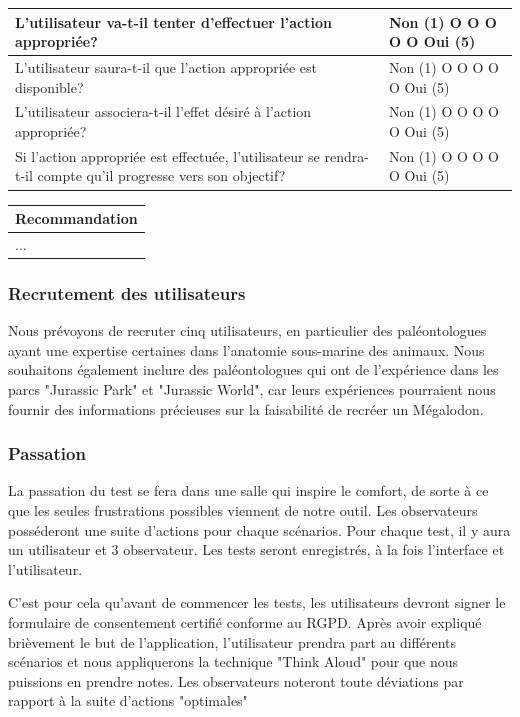 \documentclass{article}
\begin{document}
\begin{table}[h]
\centering
\begin{tabular}{|p{4cm}|p{6cm}|}
\hline
L’utilisateur va-t-il tenter d’effectuer l’action appropriée?  &  Non (1) O O O O O Oui (5)\\ \hline
L’utilisateur saura-t-il que l’action appropriée est disponible?  &  Non (1) O O O O O Oui (5)\\ \hline
L’utilisateur associera-t-il l’effet désiré à l’action appropriée?  &  Non (1) O O O O O Oui (5)\\ \hline
Si l’action appropriée est effectuée, l’utilisateur se rendra-t-il compte qu’il progresse vers son objectif?  &  Non (1) O O O O O Oui (5)\\ \hline
\end{tabular}
\end{table}

\begin{table}[h]
\centering
\begin{tabular}{|p{10cm}|}
\hline
Recommandation  \\ \hline
...  \\ \hline
\end{tabular}
\end{table}

\clearpage
\subsubsection{Recrutement des utilisateurs}
Nous prévoyons de recruter cinq utilisateurs, en particulier des paléontologues ayant une expertise certaines dans l'anatomie sous-marine des animaux. Nous souhaitons également inclure des paléontologues qui ont de l'expérience dans les parcs "Jurassic Park" et "Jurassic World", car leurs expériences pourraient nous fournir des informations précieuses sur la faisabilité de recréer un Mégalodon.



\subsubsection{Passation}
La passation du test se fera dans une salle qui inspire le comfort, de sorte à ce que les seules frustrations possibles viennent de notre outil. Les observateurs posséderont une suite d'actions pour chaque scénarios. Pour chaque test, il y aura un utilisateur et 3 observateur. Les tests seront enregistrés, à la fois l'interface et l'utilisateur.

C'est pour cela qu'avant de commencer les tests, les utilisateurs devront signer le formulaire de consentement certifié conforme au RGPD. Après avoir expliqué brièvement le but de l'application, l'utilisateur prendra part au différents scénarios et nous appliquerons la technique "Think Aloud" pour que nous puissions en prendre notes.
Les observateurs noteront toute déviations par rapport à la suite d'actions "optimales"
\end{document}
